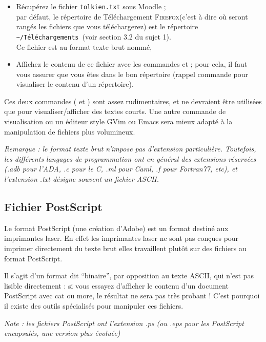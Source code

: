 \documentclass[a4paper,10pt]{article}
\newcommand{\netscape}{\textsc{Firefox}\xspace}
\newcommand{\downloadrep}{\texttt{\textasciitilde/Téléchargements }}
\begin{document}
\begin{maw}
\begin{itemize}
  \item Récupérez le fichier \texttt{tolkien.txt} sous Moodle ;\\
        par défaut, le répertoire de Téléchargement \netscape (c'est à dire où
        seront rangés les fichiers que vous téléchargerez) est le répertoire
        \downloadrep (voir section 3.2 du sujet 1).\\
        Ce fichier est au format texte brut nommé,
  \item Affichez le contenu de ce fichier avec les commandes  et
         ; pour cela, il faut vous assurer que vous êtes dans le bon
        répertoire (rappel commande  pour visualiser le contenu d'un
        répertoire).
\end{itemize}
\end{maw}

Ces deux commandes ( et ) sont assez rudimentaires, et ne
devraient être utilisées que pour visualiser/afficher des textes courts.
Une autre commande de visualisation  ou un éditeur style GVim ou
Emacs sera mieux adapté à la manipulation de fichiers plus volumineux.

\emph{Remarque : le format texte brut n'impose pas d'extension particulière.
Toutefois, les différents langages de programmation ont en général des
extensions réservées (.adb pour l'ADA, .c pour le C, .ml pour Caml, .f pour Fortran77, etc), et
l'extension .txt désigne souvent un fichier ASCII.}

\pagebreak[4]

\subsection{Fichier PostScript}
\label{ps}

Le format PostScript (une création d'Adobe) est un format destiné aux
imprimantes laser. En effet les imprimantes laser ne sont pas conçues pour
imprimer directement du texte brut elles travaillent plutôt sur des fichiers
au format PostScript.

Il s'agit d'un format dit ``binaire'', par opposition au texte ASCII, qui
n'est pas lisible directement : si vous essayez d'afficher le contenu d'un
document PostScript avec cat ou more, le résultat ne sera pas très probant !
C'est pourquoi il existe des outils spécialisés pour manipuler ces fichiers.

\emph{Note : les fichiers PostScript ont l'extension .ps (ou .eps pour les
PostScript encapsulés, une version plus évoluée)}
 
\end{document}
